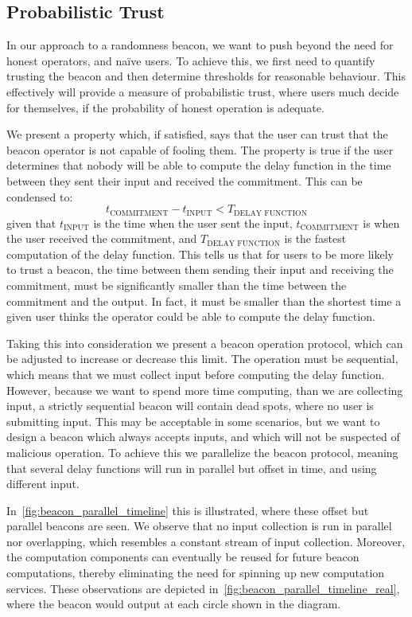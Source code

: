 \subsection{Probabilistic Trust}%
\label{sub:probabilistic_trust}
In our approach to a randomness beacon, we want to push beyond the need for honest operators, and naïve users.
To achieve this, we first need to quantify trusting the beacon and then determine thresholds for reasonable behaviour.
This effectively will provide a measure of probabilistic trust, where users much decide for themselves, if the probability of honest operation is adequate.

We present a property which, if satisfied, says that the user can trust that the beacon operator is not capable of fooling them.
The property is true if the user determines that nobody will be able to compute the delay function in the time between they sent their input and received the commitment.
This can be condensed to:
\begin{equation*}
    t_\text{COMMITMENT} - t_\text{INPUT} < T_\text{DELAY FUNCTION}
\end{equation*}
given that $t_\text{INPUT}$ is the time when the user sent the input, $t_\text{COMMITMENT}$ is when the user received the commitment, and $T_\text{DELAY FUNCTION}$ is the fastest computation of the delay function.
This tells us that for users to be more likely to trust a beacon, the time between them sending their input and receiving the commitment, must be significantly smaller than the time between the commitment and the output.
In fact, it must be smaller than the shortest time a given user thinks the operator could be able to compute the delay function.

Taking this into consideration we present a beacon operation protocol, which can be adjusted to increase or decrease this limit.
The operation must be sequential, which means that we must collect input before computing the delay function.
However, because we want to spend more time computing, than we are collecting input, a strictly sequential beacon will contain dead spots, where no user is submitting input.
This may be acceptable in some scenarios, but we want to design a beacon which always accepts inputs, and which will not be suspected of malicious operation.
To achieve this we parallelize the beacon protocol, meaning that several delay functions will run in parallel but offset in time, and using different input.

In~\cref{fig:beacon_parallel_timeline} this is illustrated, where these offset but parallel beacons are seen.
We observe that no input collection is run in parallel nor overlapping, which resembles a constant stream of input collection.
Moreover, the computation components can eventually be reused for future beacon computations, thereby eliminating the need for spinning up new computation services.
These observations are depicted in~\cref{fig:beacon_parallel_timeline_real}, where the beacon would output at each circle shown in the diagram.

